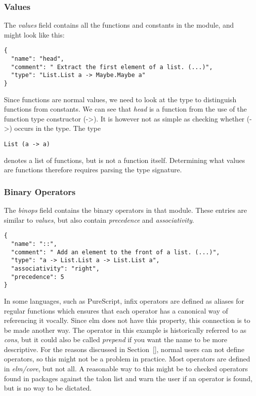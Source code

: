 \documentclass[../thesis.tex]{subfiles}
\begin{document}
\subsubsection{Values}\label{values}
The \textit{values} field contains all the functions and constants in the module, and might look like this:
\begin{verbatim}
{
  "name": "head",
  "comment": " Extract the first element of a list. (...)",
  "type": "List.List a -> Maybe.Maybe a"
}
\end{verbatim}
Since functions are normal values, we need to look at the type to distinguish functions from constants.
We can see that \textit{head} is a function from the use of the function type constructor (->).
It is however not as simple as checking whether (->) occurs in the type.
The type
\begin{verbatim}
List (a -> a)
\end{verbatim}
denotes a list of functions, but is not a function itself.
Determining what values are functions therefore requires parsing the type signature.

\subsubsection{Binary Operators}\label{binary_operators}
The \textit{binops} field contains the binary operators in that module.
These entries are similar to \textit{values}, but also contain \textit{precedence} and \textit{associativity}.
\begin{verbatim}
{
  "name": "::",
  "comment": " Add an element to the front of a list. (...)",
  "type": "a -> List.List a -> List.List a",
  "associativity": "right",
  "precedence": 5
}
\end{verbatim}
In some languages, such as PureScript, infix operators are defined as aliases
for regular functions which ensures that each operator has a canonical way of referencing it vocally.
Since elm does not have this property, this connection is to be made another way.
The operator in this example is historically referred to as \textit{cons}, but it could also be called
\textit{prepend} if you want the name to be more descriptive.
For the reasons discussed in Section~\ref{}, normal users can not define operators, so this might not be a problem in practice.
Most operators are defined in \textit{elm/core}, but not all.%
A reasonable way to this might be to checked operators found in packages against the talon list
and warn the user if an operator is found, but is no way to be dictated.
\end{document}

